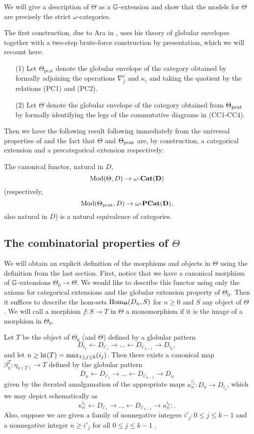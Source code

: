 We will give a description of \(\Theta\) as a \(\mathbb{G}\)-extension and show that the models for \(\Theta\) are precisely the strict \(\omega\)-categories.  

The first construction, due to Ara in \cite{ara-thesis}, uses his theory of globular envelopes together with a two-step brute-force construction by presentation, which we will recount here:

\begin{enumerate}
\item[(1)] Let \(\Theta_{\operatorname{pcat}}\) denote the globular envelope of the category obtained by formally adjoining the operations \(\nabla^i_j\) and \(\kappa_i\) and taking the quotient by the relations (PC1) and (PC2).
\item[(2)] Let \(\Theta\) denote the globular envelope of the category obtained from \(\Theta_{\operatorname{pcat}}\) by formally identifying the legs of the commutative diagrams in (CC1-CC4).
\end{enumerate}

Then we have the following result following immediately from the universal properties of  and the fact that \(\Theta\) and \(\Theta_{\operatorname{pcat}}\) are, by construction, a categorical extension and a precategorical extension respectively:

\begin{prop}
The canonical functor, natural in \(D\), \[\operatorname{Mod}(\Theta,D)\to {\operatorname{\mathbf{\omega-Cat(D)}}}\] (respectively, \[\operatorname{Mod}(\Theta_{\operatorname{pcat}},D)\to {\operatorname{\mathbf{\omega-PCat(D)}}},\] also natural in \(D\)) is a natural equivalence of categories.
\end{prop}

\subsection{The combinatorial properties of $\Theta$}
We will obtain an explicit definition of the morphisms and objects in \(\Theta\) using the definition from the last section.  First, notice that we have a canonical morphism of \(\mathbb{G}\)-extensions \(\Theta_0\to \Theta\).  We would like to describe this functor using only the axioms for categorical extensions and the globular extension property of \(\Theta_0\).  Then it suffices to describe the hom-sets \({\operatorname{Hom}}_\Theta(D_n,S)\) for \(n\geq 0\) and \(S\) any object of \(\Theta\).   We will call a morphism \(f:S\to T\) in \(\Theta\) a  monomorphism if it is the image of a morphism in \(\Theta_0\).

Let \(T\) be the object of \(\Theta_0\) (and \(\Theta\)) defined by a globular pattern 
\[D_{i_1}\leftarrow D_{i'_1}\to \dots \leftarrow D_{i'_{k-1}} \to D_{i_k},\] 
and let \(n\geq \operatorname{ht}(T)=\max_{1\leq j\leq k}(i_j)\).  Then there exists a canonical map \(\beta^T_n : \eta_{n(T)} \to T\) defined by the globular pattern \[D_{n}\leftarrow D_{i'_1}\to \dots \leftarrow D_{i'_{k-1}} \to D_{n}\] given by the iterated amalgamation of the appropriate maps \(\kappa^{i_j}_n: D_n \to D_{i_j}\), which we may depict schematically as \[\kappa^{i_1}_n\leftarrow D_{i'_1}\to \dots \leftarrow D_{i'_{k-1}} \to \kappa^{i_k}_n: .\]  Also, suppose we are given a family of nonnegative integers \(i'_j :0\leq j\leq k-1\) and a nonnegative integer \(n\geq i'_j\) for all \(0\leq j\leq k-1\) .  

